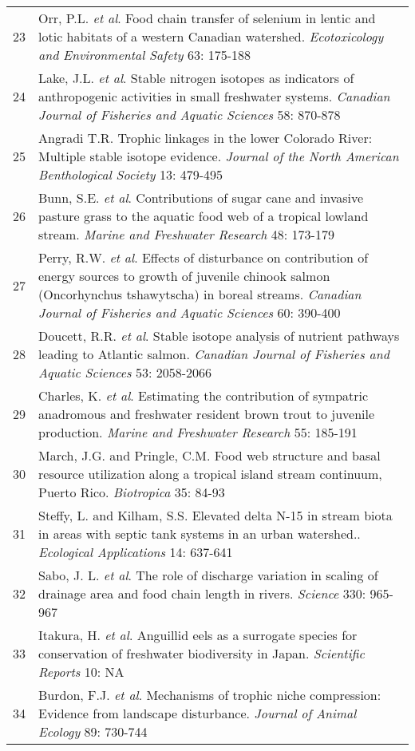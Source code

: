 \begin{longtable}{p{}p{}}
   23 & Orr, P.L. \textit{et al}. Food chain transfer of selenium in lentic and lotic habitats of a western Canadian watershed. \textit{Ecotoxicology and Environmental Safety} 63: 175-188 \\ 
   24 & Lake, J.L. \textit{et al}. Stable nitrogen isotopes as indicators of anthropogenic activities in small freshwater systems. \textit{Canadian Journal of Fisheries and Aquatic Sciences} 58: 870-878 \\ 
   25 & Angradi T.R. Trophic linkages in the lower Colorado River: Multiple stable isotope evidence. \textit{Journal of the North American Benthological Society} 13: 479-495 \\ 
   26 & Bunn, S.E. \textit{et al}. Contributions of sugar cane and invasive pasture grass to the aquatic food web of a tropical lowland stream. \textit{Marine and Freshwater Research} 48: 173-179 \\ 
   27 & Perry, R.W. \textit{et al}. Effects of disturbance on contribution of energy sources to growth of juvenile chinook salmon (Oncorhynchus tshawytscha) in boreal streams. \textit{Canadian Journal of Fisheries and Aquatic Sciences} 60: 390-400 \\ 
   28 & Doucett, R.R. \textit{et al}. Stable isotope analysis of nutrient pathways leading to Atlantic salmon. \textit{Canadian Journal of Fisheries and Aquatic Sciences} 53: 2058-2066 \\ 
   29 & Charles, K. \textit{et al}. Estimating the contribution of sympatric anadromous and freshwater resident brown trout to juvenile production. \textit{Marine and Freshwater Research} 55: 185-191 \\ 
   30 & March, J.G. and Pringle, C.M. Food web structure and basal resource utilization along a tropical island stream continuum, Puerto Rico. \textit{Biotropica} 35: 84-93 \\ 
   31 & Steffy, L. and Kilham, S.S. Elevated delta N-15 in stream biota in areas with septic tank systems in an urban watershed.. \textit{Ecological Applications} 14: 637-641 \\ 
   32 & Sabo, J. L. \textit{et al}. The role of discharge variation in scaling of drainage area and food chain length in rivers. \textit{Science} 330: 965-967 \\ 
   33 & Itakura, H. \textit{et al}. Anguillid eels as a surrogate species for conservation of freshwater biodiversity in Japan. \textit{Scientific Reports} 10: NA \\ 
   34 & Burdon, F.J. \textit{et al}. Mechanisms of trophic niche compression: Evidence from landscape disturbance. \textit{Journal of Animal Ecology} 89: 730-744 \\ 

\end{longtable}
